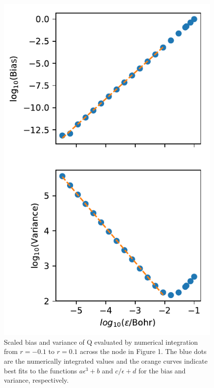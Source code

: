 \documentclass{article}
\begin{document}
\begin{figure}
\centering
\includegraphics{../plots/integratenode.pdf}
\caption{Scaled bias and variance of Q evaluated by numerical integration from $r = -0.1$ to $r = 0.1$ across the node in Figure 1. The blue dots are the numerically integrated values and the orange curves indicate best fits to the functions $a\epsilon^3 + b$ and $c/\epsilon + d$ for the bias and variance, respectively.}
\end{figure}
\end{document}
